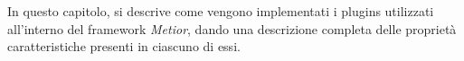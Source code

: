 In questo capitolo, si descrive come vengono implementati i plugins utilizzati all'interno del framework \emph{Metior},
dando una descrizione completa delle proprietà caratteristiche presenti in ciascuno di essi.
